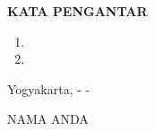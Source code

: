 {}

\begin{center}
	\textbf{KATA PENGANTAR}
\end{center}
\vspace{\baselineskip}

\begin{enumerate}
    \item 
    \item
\end{enumerate}

\begin{flushright}
    Yogyakarta, \hspace{20pt} -\hspace{20pt} - \the\year{}
    
    \vspace{3\baselineskip}
    
    NAMA ANDA
\end{flushright}
 
